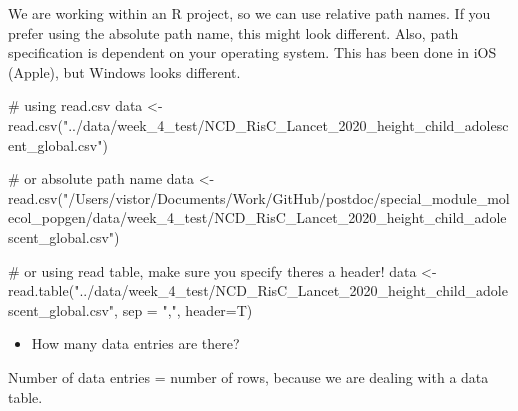 \documentclass[
  letterpaper,
  DIV=11,
  numbers=noendperiod]{scrreprt}
\newenvironment{Shaded}{}{}
\newcommand{\AttributeTok}[1]{\textcolor[rgb]{0.84,0.23,0.29}{#1}}
\newcommand{\CommentTok}[1]{\textcolor[rgb]{0.42,0.45,0.49}{#1}}
\newcommand{\FunctionTok}[1]{\textcolor[rgb]{0.44,0.26,0.76}{#1}}
\newcommand{\NormalTok}[1]{\textcolor[rgb]{0.14,0.16,0.18}{#1}}
\newcommand{\OtherTok}[1]{\textcolor[rgb]{0.44,0.26,0.76}{#1}}
\newcommand{\StringTok}[1]{\textcolor[rgb]{0.01,0.18,0.38}{#1}}
\providecommand{\tightlist}{%
  \setlength{\itemsep}{0pt}\setlength{\parskip}{0pt}}\usepackage{longtable,booktabs,array}
\begin{document}
\begin{tcolorbox}[enhanced jigsaw, arc=.35mm, left=2mm, titlerule=0mm, rightrule=.15mm, colframe=quarto-callout-tip-color-frame, coltitle=black, colback=white, opacityback=0, bottomtitle=1mm, bottomrule=.15mm, colbacktitle=quarto-callout-tip-color!10!white, breakable, title=\textcolor{quarto-callout-tip-color}{\faLightbulb}\hspace{0.5em}{Code and answer}, toptitle=1mm, toprule=.15mm, opacitybacktitle=0.6, leftrule=.75mm]

We are working within an R project, so we can use relative path names.
If you prefer using the absolute path name, this might look different.
Also, path specification is dependent on your operating system. This has
been done in iOS (Apple), but Windows looks different.

\begin{Shaded}
\begin{Highlighting}[]
\CommentTok{\# using read.csv}
\NormalTok{data }\OtherTok{\textless{}{-}} \FunctionTok{read.csv}\NormalTok{(}\StringTok{"../data/week\_4\_test/NCD\_RisC\_Lancet\_2020\_height\_child\_adolescent\_global.csv"}\NormalTok{)}

\CommentTok{\# or absolute path name}
\NormalTok{data }\OtherTok{\textless{}{-}} \FunctionTok{read.csv}\NormalTok{(}\StringTok{"/Users/vistor/Documents/Work/GitHub/postdoc/special\_module\_molecol\_popgen/data/week\_4\_test/NCD\_RisC\_Lancet\_2020\_height\_child\_adolescent\_global.csv"}\NormalTok{) }

\CommentTok{\# or using read table, make sure you specify there\textquotesingle{}s a header!}
\NormalTok{data }\OtherTok{\textless{}{-}} \FunctionTok{read.table}\NormalTok{(}\StringTok{"../data/week\_4\_test/NCD\_RisC\_Lancet\_2020\_height\_child\_adolescent\_global.csv"}\NormalTok{, }\AttributeTok{sep =} \StringTok{","}\NormalTok{, }\AttributeTok{header=}\NormalTok{T)}
\end{Highlighting}
\end{Shaded}

\end{tcolorbox}

\begin{itemize}
\tightlist
\item
  How many data entries are there?
\end{itemize}

Number of data entries = number of rows, because we are dealing with a
data table.
\end{document}
